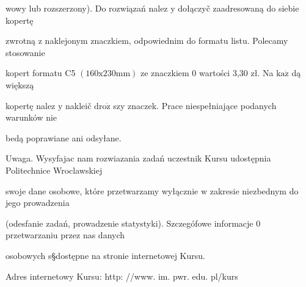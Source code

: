\documentclass[a4paper,12pt]{article}
\begin{document}
wowy lub rozszerzony). Do rozwiązań nalez $\mathrm{y}$ dołączyč zaadresowaną do siebie kopertę

zwrotną $\mathrm{z}$ naklejonym znaczkiem, odpowiednim do formatu listu. Polecamy stosowanie

kopert formatu C5 $(160\mathrm{x}230\mathrm{m}\mathrm{m})$ ze znaczkiem $0$ wartości 3,30 zł. Na $\mathrm{k}\mathrm{a}\dot{\mathrm{z}}$ dą większą

kopertę nalez $\mathrm{y}$ nakleič $\mathrm{d}\mathrm{r}\mathrm{o}\dot{\mathrm{z}}$ szy znaczek. Prace niespełniające podanych warunków nie

bedą poprawiane ani odsyłane.

Uwaga. Wysyfajac nam rozwiazania zadań uczestnik Kursu udostępnia Politechnice Wroclawskiej

swoje dane osobowe, które przetwarzamy wyłącznie $\mathrm{w}$ zakresie niezbednym do jego prowadzenia

(odesfanie zadań, prowadzenie statystyki). Szczegófowe informacje $0$ przetwarzaniu przez nas danych

osobowych s\S dostępne na stronie internetowej Kursu.

Adres internetowy Kursu: http: //www. im. pwr. edu. pl/kurs
\end{document}
